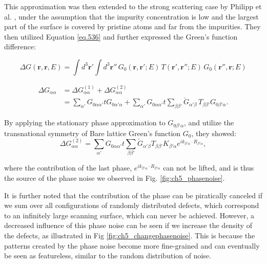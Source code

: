 This approximation was then extended to the strong scattering case by Philipp et al. \cite{russmannInitioTheoryFourierTransformed2021}, under the assumption that the impurity concentration is low and the largest part of the surface is covered by pristine atoms and far from the impurities. They then utilized Equation \ref{eq.536} and further expressed the Green's function difference:

\[
\Delta G(\mathbf{r}, \mathbf{r}, E) = \int d^3 \mathbf{r}' \int d^3 \mathbf{r}'' \, G_0(\mathbf{r}, \mathbf{r}'; E) \, T(\mathbf{r}', \mathbf{r}''; E) \, G_0(\mathbf{r}'', \mathbf{r}; E)
\]

\begin{align}
	\label{eq.537}
	\Delta G_{\alpha \alpha} &= \Delta G^{(1)}_{\alpha \alpha} + \Delta G^{(2)}_{\alpha \alpha} \\
	\label{eq.538}
	&= \sum_{\alpha'} G_{0\alpha \alpha'} t G_{0\alpha' \alpha} + \sum_{\alpha'} G_{0\alpha \alpha'} t\sum_{\beta \beta'} \check{G}_{\alpha' \beta} \, T_{\beta \beta'} G_{0\beta' \alpha}.
\end{align}

\noindent By applying the stationary phase approximation \cite{lounisTheoryRealSpace2011} to $G_{0\beta'\alpha}$, and utilize the transnational symmetry of Bare lattice Green's function $G_0$, they showed:
\begin{equation}
\label{eq.539}
\Delta G^{(2)}_{\alpha\alpha}=\sum_{\alpha'}G_{0\alpha\alpha'}t\sum_{\beta\beta'}\check{G}_{\alpha'\beta}T_{\beta\beta'}K_{\beta'\alpha}e^{ik_{\beta'\alpha}\cdot R_{\beta'\alpha}},
\end{equation}

\noindent where the contribution of the last phase, $e^{ik_{\beta'\alpha}\cdot R_{\beta'\alpha}}$ can not be lifted, and is thus the source of the phase noise we observed in Fig. \ref{fig:ch5_phasenoise}. 

It is further noted that the contribution of the phase can be piratically canceled if we sum over all configurations of randomly distributed defects, which correspond to an infinitely large scanning surface, which can never be achieved. However, a decreased influence of this phase noise can be seen if we increase the density of the defects, as illustrated in Fig \ref{fig:ch5_changephasenoise}. This is because the patterns created by the phase noise become more fine-grained and can eventually be seen as featureless, similar to the random distribution of noise.  

